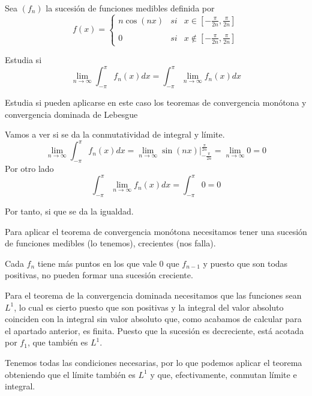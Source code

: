 \begin{problem}[20]
Sea $(f_n)$ la sucesión de funciones medibles definida por
\[f(x)= \left\{ \begin{array}{lcc}
             n\cos(nx) &   si  & x \in [-\frac{\pi}{2n}, \frac{\pi}{2n}] \\
             \\ 0 &  si  & x \notin [-\frac{\pi}{2n}, \frac{\pi}{2n}]
             \end{array}
   \right.\]

Estudia si
\[\lim_{n\to \infty}\int_{-\pi}^{\pi}f_n(x) dx = \int_{-\pi}^{\pi}\lim_{n\to \infty} f_n(x)dx\]

Estudia si pueden aplicarse en este caso los teoremas de convergencia monótona y convergencia dominada de Lebesgue

\solution

Vamos a ver si se da la conmutatividad de integral y límite.
\[\lim_{n\to \infty}\int_{-\pi}^{\pi}f_n(x) dx = \lim_{n\to \infty} \sin(nx)|_{-\frac{\pi}{2n}}^{\frac{\pi}{2n}}=\lim_{n\to \infty} 0 = 0\]
Por otro lado
\[\int_{-\pi}^{\pi}\lim_{n\to \infty} f_n(x)dx = \int_{-\pi}^{\pi} 0 = 0\]

Por tanto, si que se da la igualdad.

Para aplicar el teorema de convergencia monótona necesitamos tener una sucesión de funciones medibles (lo tenemos), crecientes (nos falla).

Cada $f_n$ tiene más puntos en los que vale 0 que $f_{n-1}$ y puesto que son todas positivas, no pueden formar una sucesión creciente.

Para el teorema de la convergencia dominada necesitamos que las funciones sean $L^1$, lo cual es cierto puesto que son positivas y la integral del valor absoluto coinciden con la integral sin valor absoluto que, como acabamos de calcular para el apartado anterior, es finita. Puesto que la sucesión es decreciente, está acotada por $f_1$, que también es $L^1$.

Tenemos todas las condiciones necesarias, por lo que podemos aplicar el teorema obteniendo que el límite también es $L^1$ y que, efectivamente, conmutan límite e integral.
\end{problem}

